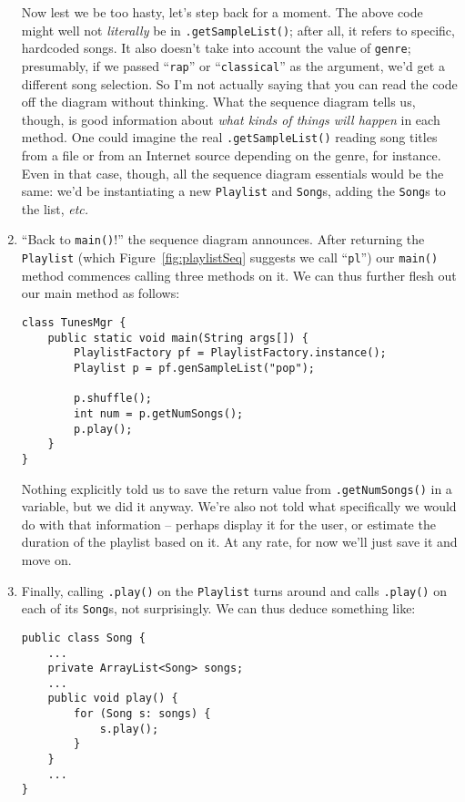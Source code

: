 \begin{enumerate}
Now lest we be too hasty, let's step back for a moment. The above code
might well not \textit{literally} be in \texttt{.getSampleList()}; after all,
it refers to specific, hardcoded songs. It also doesn't take into account the
value of \texttt{genre}; presumably, if we passed ``\texttt{rap}'' or
``\texttt{classical}'' as the argument, we'd get a different song selection. So
I'm not actually saying that you can read the code off the diagram without
thinking. What the sequence diagram tells us, though, is good information
about \textit{what kinds of things will happen} in each method. One could
imagine the real \texttt{.getSampleList()} reading song titles from a file or
from an Internet source depending on the genre, for instance. Even in that
case, though, all the sequence diagram essentials would be the same: we'd be
instantiating a new \texttt{Playlist} and \texttt{Song}s, adding the
\texttt{Song}s to the list, \textit{etc.}

\item ``Back to \texttt{main()}!'' the sequence diagram announces. After
returning the \texttt{Playlist} (which Figure~\ref{fig:playlistSeq} suggests
we call ``\texttt{pl}'') our \texttt{main()} method commences calling three
methods on it. We can thus further flesh out our main method as follows:

\begin{Verbatim}[fontsize=\footnotesize,samepage=true,frame=single]
class TunesMgr {
    public static void main(String args[]) {
        PlaylistFactory pf = PlaylistFactory.instance();
        Playlist p = pf.genSampleList("pop");

        p.shuffle();
        int num = p.getNumSongs();
        p.play();
    }
}
\end{Verbatim}

Nothing explicitly told us to save the return value from
\texttt{.getNumSongs()} in a variable, but we did it anyway. We're also not
told what specifically we would do with that information -- perhaps display it
for the user, or estimate the duration of the playlist based on it. At any
rate, for now we'll just save it and move on.

\item Finally, calling \texttt{.play()} on the \texttt{Playlist} turns around
and calls \texttt{.play()} on each of its \texttt{Song}s, not surprisingly. We
can thus deduce something like:

\begin{Verbatim}[fontsize=\footnotesize,samepage=true,frame=single]
public class Song {
    ...
    private ArrayList<Song> songs;
    ...
    public void play() {
        for (Song s: songs) {
            s.play();
        }         
    }
    ...
}
\end{Verbatim}


\end{enumerate}
